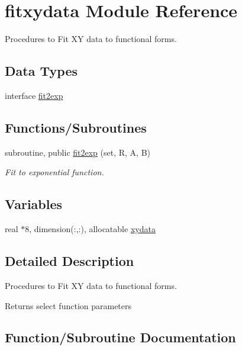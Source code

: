\hypertarget{namespacefitxydata}{}\section{fitxydata Module Reference}
\label{namespacefitxydata}


Procedures to Fit XY data to functional forms.  


\subsection*{Data Types}
\begin{DoxyCompactItemize}
\item 
interface \hyperlink{interfacefitxydata_1_1fit2exp}{fit2exp}
\end{DoxyCompactItemize}
\subsection*{Functions/\+Subroutines}
\begin{DoxyCompactItemize}
\item 
subroutine, public \hyperlink{namespacefitxydata_a9f00dca017c2372da0c3c95cdf0ddb31}{fit2exp} (set, R, A, B)
\begin{DoxyCompactList}\small\item\em Fit to exponential function. \end{DoxyCompactList}\end{DoxyCompactItemize}
\subsection*{Variables}
\begin{DoxyCompactItemize}
\item 
real $\ast$8, dimension(\+:,\+:), allocatable \hyperlink{namespacefitxydata_ad69a6716eab16a1f8c170a0d0a7ed499}{xydata}
\end{DoxyCompactItemize}


\subsection{Detailed Description}
Procedures to Fit XY data to functional forms. 

Returns select function parameters 

\subsection{Function/\+Subroutine Documentation}
\mbox{\label{namespacefitxydata_a9f00dca017c2372da0c3c95cdf0ddb31}} 
